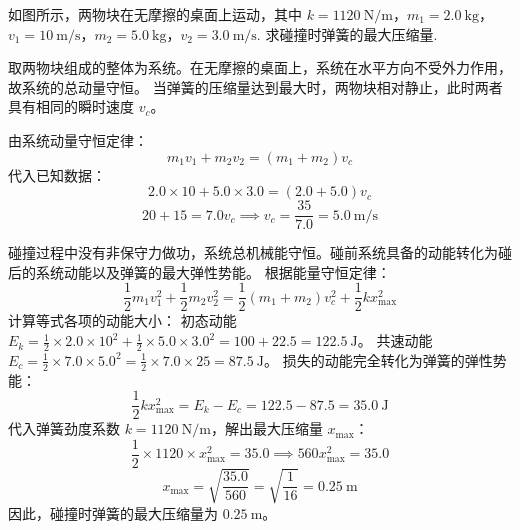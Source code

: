 \begin{exercise}\label{ex:5.6}
如图所示，两物块在无摩擦的桌面上运动，其中 $k=1120 \ \mathrm{N/m}$，$m_1 = 2.0 \ \mathrm{kg}$，$v_1 = 10 \ \mathrm{m/s}$，$m_2 = 5.0 \ \mathrm{kg}$，$v_2 = 3.0 \ \mathrm{m/s}$. 求碰撞时弹簧的最大压缩量.
\begin{center}
\end{center}
\end{exercise}
\begin{solution}
取两物块组成的整体为系统。在无摩擦的桌面上，系统在水平方向不受外力作用，故系统的总动量守恒。
当弹簧的压缩量达到最大时，两物块相对静止，此时两者具有相同的瞬时速度 $v_c$。

由系统动量守恒定律：
$$ m_1 v_1 + m_2 v_2 = (m_1 + m_2) v_c $$
代入已知数据：
$$ 2.0 \times 10 + 5.0 \times 3.0 = (2.0 + 5.0) v_c $$
$$ 20 + 15 = 7.0 v_c \implies v_c = \frac{35}{7.0} = 5.0 \ \mathrm{m/s} $$

碰撞过程中没有非保守力做功，系统总机械能守恒。碰前系统具备的动能转化为碰后的系统动能以及弹簧的最大弹性势能。
根据能量守恒定律：
$$ \frac{1}{2} m_1 v_1^2 + \frac{1}{2} m_2 v_2^2 = \frac{1}{2} (m_1 + m_2) v_c^2 + \frac{1}{2} k x_{\text{max}}^2 $$
计算等式各项的动能大小：
初态动能 $E_{k} = \frac{1}{2} \times 2.0 \times 10^2 + \frac{1}{2} \times 5.0 \times 3.0^2 = 100 + 22.5 = 122.5 \ \mathrm{J}$。
共速动能 $E_{c} = \frac{1}{2} \times 7.0 \times 5.0^2 = \frac{1}{2} \times 7.0 \times 25 = 87.5 \ \mathrm{J}$。
损失的动能完全转化为弹簧的弹性势能：
$$ \frac{1}{2} k x_{\text{max}}^2 = E_k - E_c = 122.5 - 87.5 = 35.0 \ \mathrm{J} $$
代入弹簧劲度系数 $k = 1120 \ \mathrm{N/m}$，解出最大压缩量 $x_{\text{max}}$：
$$ \frac{1}{2} \times 1120 \times x_{\text{max}}^2 = 35.0 \implies 560 x_{\text{max}}^2 = 35.0 $$
$$ x_{\text{max}} = \sqrt{\frac{35.0}{560}} = \sqrt{\frac{1}{16}} = 0.25 \ \mathrm{m} $$
因此，碰撞时弹簧的最大压缩量为 $0.25 \ \mathrm{m}$。
\end{solution}

